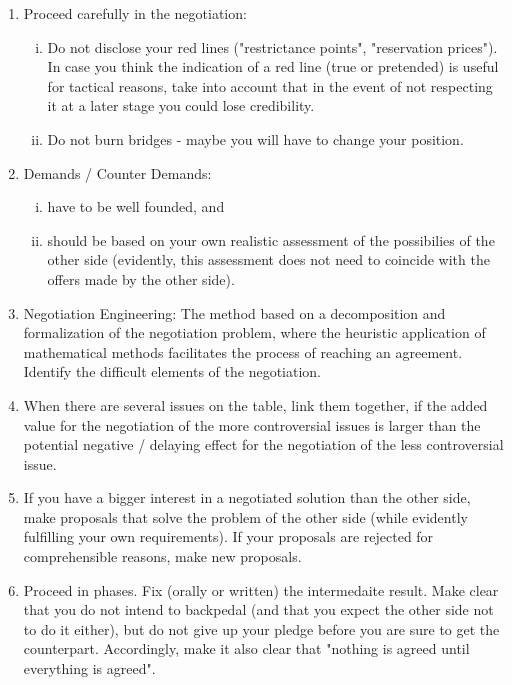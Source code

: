 \begin{enumerate}
    \item Proceed carefully in the negotiation:
        \begin{enumerate}[(i)]
            \item Do not disclose your red lines ("restrictance points", "reservation
                prices"). In case you think the indication of a red line (true or
                pretended) is useful for tactical reasons, take into account that
                in the event of not respecting it at a later stage you could lose
                credibility.
            \item Do not burn bridges - maybe you will have to change your position.
        \end{enumerate}
    \item Demands / Counter Demands:
        \begin{enumerate}[(i)]
            \item have to be well founded, and
            \item should be based on your own realistic assessment of the possibilies
                of the other side (evidently, this assessment does not need to
                coincide with the offers made by the other side).
        \end{enumerate}
    \item Negotiation Engineering: The method based on a decomposition and
        formalization of the negotiation problem, where the heuristic application
        of mathematical methods facilitates the process of reaching an agreement.
        Identify the difficult elements of the negotiation.
    \item When there are several issues on the table, link them together, if the
        added value for the negotiation of the more controversial issues is larger
        than the potential negative / delaying effect for the negotiation of the
        less controversial issue.
    \item If you have a bigger interest in a negotiated solution than the other
        side, make proposals that solve the problem of the other side (while
        evidently fulfilling your own requirements). If your proposals are rejected
        for comprehensible reasons, make new proposals.
    \item Proceed in phases. Fix (orally or written) the intermedaite result. Make
        clear that you do not intend to backpedal (and that you expect the other
        side not to do it either), but do not give up your pledge before you are
        sure to get the counterpart. Accordingly, make it also clear that
        "nothing is agreed until everything is agreed".
\end{enumerate}


